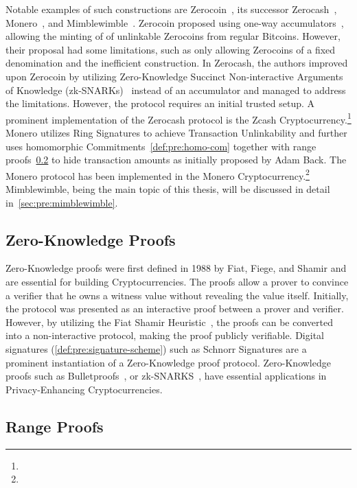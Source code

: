 Notable examples of such constructions are Zerocoin~\cite{miers2013zerocoin}, its successor Zerocash~\cite{sasson2014zerocash}, Monero~\cite{noether2015ring}, and Mimblewimble~\cite{jedusor2016mimblewimble}.
Zerocoin proposed using one-way accumulators~\cite{benaloh1993one}, allowing the minting of of unlinkable Zerocoins from regular Bitcoins.
However, their proposal had some limitations, such as only allowing Zerocoins of a fixed denomination and the inefficient construction.
In Zerocash, the authors improved upon Zerocoin by utilizing Zero-Knowledge Succinct Non-interactive Arguments of Knowledge (zk-SNARKs)~\cite{bitansky2012extractable} instead of an accumulator and managed to address the limitations.
However, the protocol requires an initial trusted setup.
A prominent implementation of the Zerocash protocol is the Zcash Cryptocurrency.\footnote{\urlzcash}
Monero utilizes Ring Signatures to achieve Transaction Unlinkability and further uses homomorphic Commitments~\cref{def:pre:homo-com} together with range proofs~\cref{sec:pre:rangeproof} to hide transaction amounts as initially proposed by Adam Back.
The Monero protocol has been implemented in the Monero Cryptocurrency.\footnote{\urlmonero}
Mimblewimble, being the main topic of this thesis, will be discussed in detail in~\cref{sec:pre:mimblewimble}.

\subsection{Zero-Knowledge Proofs} \label{sec:pre:privacy:zeroknowlegde}

Zero-Knowledge proofs were first defined in 1988 by Fiat, Fiege, and Shamir and are essential for building Cryptocurrencies.
The proofs allow a prover to convince a verifier that he owns a witness value without revealing the value itself.
Initially, the protocol was presented as an interactive proof between a prover and verifier.
However, by utilizing the Fiat Shamir Heuristic~\cite{feige1988zero}, the proofs can be converted into a non-interactive protocol, making the proof publicly verifiable.
Digital signatures (\cref{def:pre:signature-scheme}) such as Schnorr Signatures are a prominent instantiation of a Zero-Knowledge proof protocol.
Zero-Knowledge proofs such as Bulletproofs~\cite{bunz2018bulletproofs}, or zk-SNARKS~\cite{bitansky2012extractable}, have essential applications in Privacy-Enhancing Cryptocurrencies.

\subsection{Range Proofs} \label{sec:pre:rangeproof}

